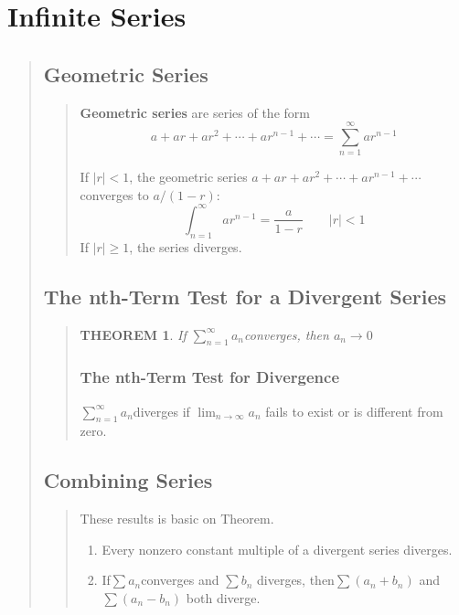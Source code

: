 \documentclass{report}
\newtheorem{theorem}{THEOREM}
\begin{document}
\section{Infinite Series }
\begin{quote}

	\subsection{Geometric Series}
	\begin{quote}

		\textbf{Geometric series} are series of the form 
		$$a + ar + ar^2 +\cdots + ar^{n - 1} + \cdots = \sum_{n = 1}^{\infty} a r^{n-1}$$

		If $| r | < 1$, the geometric series $a + ar + ar^2 + \cdots + ar^{n-1} + \cdots$ converges to $a/(1-r)$:
		$$\int_{n = 1}^{\infty} ar^{n-1} = \frac{a}{1-r}\qquad |r|<1$$
		If $|r| \geq 1$, the series diverges.

	\end{quote}

	\subsection{The nth-Term Test for a Divergent Series}
	\begin{quote}

		\begin{theorem}
			If $\sum_{n=1}^{\infty}a_n$converges, then $a_n\to 0$
		\end{theorem}

		\subsubsection{The nth-Term Test for Divergence}
		$\sum_{n=1}^{\infty}a_n$diverges if $\lim_{n\to\infty}a_n$ fails to exist or is different from zero.

	\end{quote}

	\subsection{Combining Series}
	\begin{quote}

		These results is basic on Theorem.

		\begin{enumerate}
			\item Every nonzero constant multiple of a divergent series diverges.
			\item If$\sum a_n$converges and $\sum b_n$ diverges, then$\sum (a_n + b_n)$ and $\sum (a_n - b_n)$ both diverge.
		\end{enumerate}

	\end{quote}


\end{quote}
\end{document}

